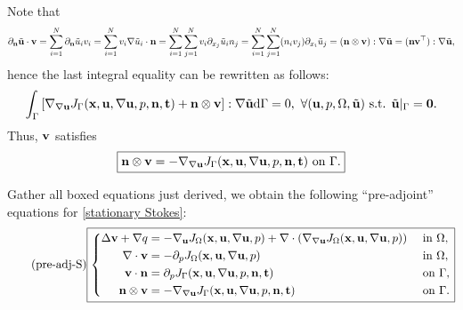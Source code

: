 \documentclass[oneside]{book}
\numberwithin{equation}{section}
\begin{document}
\begin{itemize}
\begin{itemize}
\begin{align*}
        \end{align*}
        Note that
        \begin{align*}
            \partial_{\bf n}\tilde{\bf u}\cdot{\bf v} = \sum_{i=1}^N \partial_{\bf n}\tilde{u}_iv_i = \sum_{i=1}^N v_i\nabla\tilde{u}_i\cdot{\bf n} = \sum_{i=1}^N\sum_{j=1}^N v_i\partial_{x_j}\tilde{u}_in_j = \sum_{i=1}^N\sum_{j=1}^N (n_iv_j)\partial_{x_i}\tilde{u}_j = ({\bf n}\otimes{\bf v}):\nabla\tilde{\bf u} = ({\bf n}{\bf v}^\top):\nabla\tilde{\bf u},
        \end{align*}
        hence the last integral equality can be rewritten as follows:
        \begin{align*}
            \int_\Gamma \left[\nabla_{\nabla{\bf u}}J_\Gamma({\bf x},{\bf u},\nabla{\bf u},p,{\bf n},{\bf t}) + {\bf n}\otimes{\bf v}\right]:\nabla\tilde{\bf u}{\rm d}\Gamma = 0,\ \forall({\bf u},p,\Omega,\tilde{\bf u}) \mbox{ s.t. } \tilde{\bf u}|_\Gamma = {\bf 0}.
        \end{align*}
        Thus, ${\bf v}$ satisfies
        \begin{align*}
            \boxed{{\bf n}\otimes{\bf v} = -\nabla_{\nabla{\bf u}}J_\Gamma({\bf x},{\bf u},\nabla{\bf u},p,{\bf n},{\bf t}) \mbox{ on } \Gamma.}
        \end{align*}
    \end{itemize}
    Gather all boxed equations just derived, we obtain the following ``pre-adjoint'' equations for \eqref{stationary Stokes}:
    \begin{equation}
        \label{pre-adjoint of stationary Stokes}
        \tag{pre-adj-S}
        \boxed{\left\{\begin{split}
            \Delta{\bf v} + \nabla q &= -\nabla_{\bf u}J_\Omega({\bf x},{\bf u},\nabla{\bf u},p) + \nabla\cdot(\nabla_{\nabla{\bf u}}J_\Omega({\bf x},{\bf u},\nabla{\bf u},p)) &&\mbox{ in } \Omega,\\
            \nabla\cdot{\bf v} &= -\partial_pJ_\Omega({\bf x},{\bf u},\nabla{\bf u},p) &&\mbox{ in } \Omega,\\
            {\bf v}\cdot{\bf n} &= \partial_pJ_\Gamma({\bf x},{\bf u},\nabla{\bf u},p,{\bf n},{\bf t}) &&\mbox{ on } \Gamma,\\
            {\bf n}\otimes{\bf v} &= -\nabla_{\nabla{\bf u}}J_\Gamma({\bf x},{\bf u},\nabla{\bf u},p,{\bf n},{\bf t}) &&\mbox{ on } \Gamma.
        \end{split}\right.}
    \end{equation}


\end{itemize}
\end{document}
